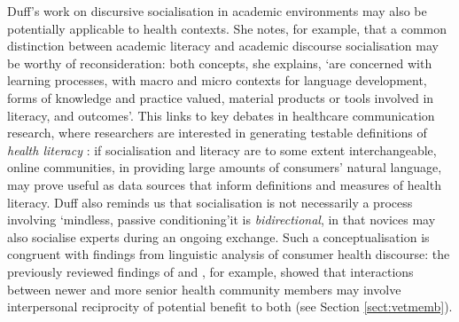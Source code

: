 Duff's work on discursive socialisation in academic environments \parencite*[p.~171]{duff_language_2010} may also be potentially applicable to health contexts. She notes, for example, that a common distinction between academic literacy and academic discourse socialisation may be worthy of reconsideration: both concepts, she explains, `are concerned with learning processes, with macro and micro contexts for language development, forms of knowledge and practice valued, material products or tools involved in literacy, and outcomes'. This links to key debates in healthcare communication research, where researchers are interested in generating testable definitions of \emph{health literacy} \cite{frisch2012defining,jorm_research_2006}: if socialisation and literacy are to some extent interchangeable, online communities, in providing large amounts of consumers' natural language, may prove useful as data sources that inform definitions and measures of health literacy. Duff also reminds us that socialisation is not necessarily a process involving `mindless, passive conditioning'\textemdash{}it is \emph{bidirectional}, in that novices may also socialise experts during an ongoing exchange. Such a conceptualisation is congruent with findings from linguistic analysis of consumer health discourse: the previously reviewed findings of \textcite{pudlinski_giving_1998} and \textcite{kouper_pragmatics_2010}, for example, showed that interactions between newer and more senior health community members may involve interpersonal reciprocity of potential benefit to both (see Section \ref{sect:vetmemb}).



